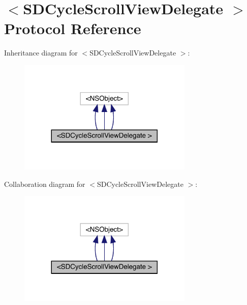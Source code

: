 \hypertarget{protocol_s_d_cycle_scroll_view_delegate_01-p}{}\section{$<$S\+D\+Cycle\+Scroll\+View\+Delegate $>$ Protocol Reference}
\label{protocol_s_d_cycle_scroll_view_delegate_01-p}


Inheritance diagram for $<$S\+D\+Cycle\+Scroll\+View\+Delegate $>$\+:\nopagebreak
\begin{figure}[H]
\begin{center}
\leavevmode
\includegraphics[width=236pt]{protocol_s_d_cycle_scroll_view_delegate_01-p__inherit__graph}
\end{center}
\end{figure}


Collaboration diagram for $<$S\+D\+Cycle\+Scroll\+View\+Delegate $>$\+:\nopagebreak
\begin{figure}[H]
\begin{center}
\leavevmode
\includegraphics[width=236pt]{protocol_s_d_cycle_scroll_view_delegate_01-p__coll__graph}
\end{center}
\end{figure}

